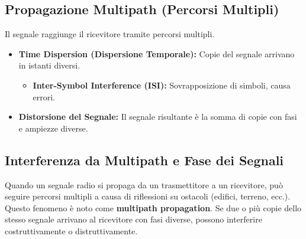 \subsection{Propagazione Multipath (Percorsi Multipli)}
Il segnale raggiunge il ricevitore tramite percorsi multipli.
\begin{itemize}
    \item \textbf{Time Dispersion (Dispersione Temporale):} Copie del segnale arrivano in istanti diversi.
    \begin{itemize}
        \item \textbf{Inter-Symbol Interference (ISI):} Sovrapposizione di simboli, causa errori.
    \end{itemize}
    \item \textbf{Distorsione del Segnale:} Il segnale risultante è la somma di copie con fasi e ampiezze diverse.
\end{itemize}



\subsection{Interferenza da Multipath e Fase dei Segnali}
\label{sec:multipath-fase}

Quando un segnale radio si propaga da un trasmettitore a un ricevitore, può seguire percorsi multipli a causa di riflessioni su ostacoli (edifici, terreno, ecc.). Questo fenomeno è noto come \textbf{multipath propagation}. Se due o più copie dello stesso segnale arrivano al ricevitore con fasi diverse, possono interferire costruttivamente o distruttivamente.

